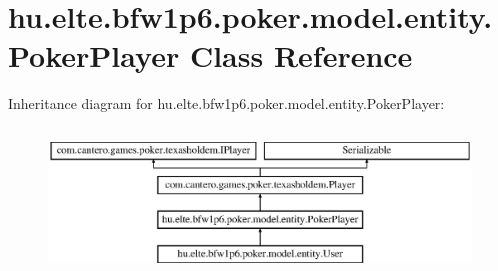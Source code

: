 \hypertarget{classhu_1_1elte_1_1bfw1p6_1_1poker_1_1model_1_1entity_1_1_poker_player}{}\section{hu.\+elte.\+bfw1p6.\+poker.\+model.\+entity.\+Poker\+Player Class Reference}
\label{classhu_1_1elte_1_1bfw1p6_1_1poker_1_1model_1_1entity_1_1_poker_player}
Inheritance diagram for hu.\+elte.\+bfw1p6.\+poker.\+model.\+entity.\+Poker\+Player\+:\begin{figure}[H]
\begin{center}
\leavevmode
\includegraphics[height=3.943662cm]{classhu_1_1elte_1_1bfw1p6_1_1poker_1_1model_1_1entity_1_1_poker_player}
\end{center}
\end{figure}
